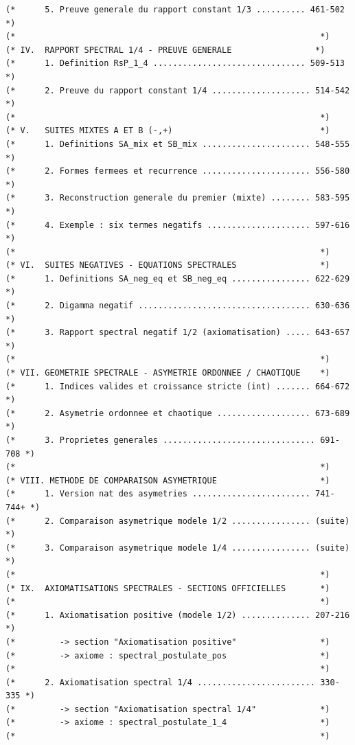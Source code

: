 \documentclass[a4paper,11pt]{article}
\begin{document}
\begin{holcode}[title={\textcolor{white}{File: methode\_spectral.thy -- Part 1/4}}]
\begin{lstlisting}
(*      5. Preuve generale du rapport constant 1/3 .......... 461-502 *)
(*                                                              *)
(* IV.  RAPPORT SPECTRAL 1/4 - PREUVE GENERALE                 *)
(*      1. Definition RsP_1_4 ............................... 509-513 *)
(*      2. Preuve du rapport constant 1/4 .................... 514-542 *)
(*                                                              *)
(* V.   SUITES MIXTES A ET B (-,+)                              *)
(*      1. Definitions SA_mix et SB_mix ...................... 548-555 *)
(*      2. Formes fermees et recurrence ...................... 556-580 *)
(*      3. Reconstruction generale du premier (mixte) ........ 583-595 *)
(*      4. Exemple : six termes negatifs ..................... 597-616 *)
(*                                                              *)
(* VI.  SUITES NEGATIVES - EQUATIONS SPECTRALES                 *)
(*      1. Definitions SA_neg_eq et SB_neg_eq ................ 622-629 *)
(*      2. Digamma negatif ................................... 630-636 *)
(*      3. Rapport spectral negatif 1/2 (axiomatisation) ..... 643-657 *)
(*                                                              *)
(* VII. GEOMETRIE SPECTRALE - ASYMETRIE ORDONNEE / CHAOTIQUE    *)
(*      1. Indices valides et croissance stricte (int) ....... 664-672 *)
(*      2. Asymetrie ordonnee et chaotique ................... 673-689 *)
(*      3. Proprietes generales ............................... 691-708 *)
(*                                                              *)
(* VIII. METHODE DE COMPARAISON ASYMETRIQUE                     *)
(*      1. Version nat des asymetries ........................ 741-744+ *)
(*      2. Comparaison asymetrique modele 1/2 ................ (suite) *)
(*      3. Comparaison asymetrique modele 1/4 ................ (suite) *)
(*                                                              *)
(* IX.  AXIOMATISATIONS SPECTRALES - SECTIONS OFFICIELLES       *)
(*                                                              *)
(*      1. Axiomatisation positive (modele 1/2) .............. 207-216 *)
(*         -> section "Axiomatisation positive"                 *)
(*         -> axiome : spectral_postulate_pos                   *)
(*                                                              *)
(*      2. Axiomatisation spectral 1/4 ........................ 330-335 *)
(*         -> section "Axiomatisation spectral 1/4"             *)
(*         -> axiome : spectral_postulate_1_4                   *)
(*                                                              *)

\end{lstlisting}
\end{holcode}
\end{document}
